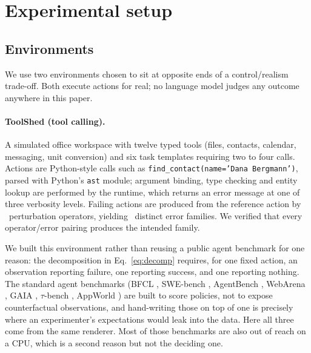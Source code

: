 \section{Experimental setup}
\label{sec:setup}

\subsection{Environments}

We use two environments chosen to sit at opposite ends of a control/realism
trade-off. Both execute actions for real; no language model judges any outcome
anywhere in this paper.

\paragraph{ToolShed (tool calling).}
A simulated office workspace with twelve typed tools (files, contacts, calendar,
messaging, unit conversion) and six task templates requiring two to four calls.
Actions are Python-style calls such as
\texttt{find\_contact(name='Dana Bergmann')}, parsed with Python's \texttt{ast}
module; argument binding, type checking and entity lookup are performed by the
runtime, which returns an error message at one of three verbosity levels.
Failing actions are produced from the reference action by
\NumToolshedOperators\ perturbation operators, yielding
\NumToolshedErrorTypes\ distinct error families. We verified that every
operator/error pairing produces the intended family.

We built this environment rather than reusing a public agent benchmark for one
reason: the decomposition in Eq.~\eqref{eq:decomp} requires, for one fixed
action, an observation reporting failure, one reporting success, and one
reporting nothing. The standard agent benchmarks (BFCL
\citep{patil2024gorilla}, SWE-bench \citep{jimenez2024swebench}, AgentBench
\citep{liu2024agentbench}, WebArena \citep{zhou2024webarena}, GAIA
\citep{mialon2024gaia}, $\tau$-bench \citep{yao2024taubench}, AppWorld \citep{trivedi2024appworld}) are built to score policies, not to expose
counterfactual observations, and hand-writing those on top of one is precisely
where an experimenter's expectations would leak into the data. Here all three
come from the same renderer. Most of those benchmarks are also out of reach on a
CPU, which is a second reason but not the deciding one.

